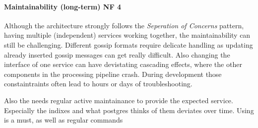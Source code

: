 \paragraph{Maintainability (long-term) NF 4}
Although the architecture strongly follows the \textit{Seperation of Concerns} pattern,
having multiple (independent) services working together, the maintainability can still be challenging.
Different gossip formats require delicate handling as updating already inserted gossip messages can get really difficult.
Also changing the interface of one service can have devistating cascading effects,
where the other components in the processing pipeline crash.
During development those constaintraints often lead to hours or days of troubleshooting.

Also the  needs regular active maintainance to provide the expected service.
Especially the indixes and what postgres thinks of them deviates over time.
Using  is a must, as well as regular  commands  
\fi
